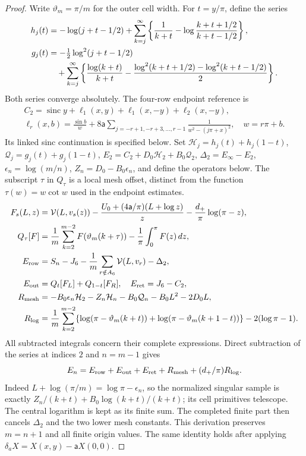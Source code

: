 \begin{proof}
Write $\vartheta_m=\pi/m$ for the outer cell width. For $t=y/\pi$, define the series
\begin{align}\label{uc:mesh-series}
 h_j(t)&=-\log(j+t-1/2)+\sum_{k=j}^\infty
 \left\{\frac1{k+t}-\log\frac{k+t+1/2}{k+t-1/2}\right\},\notag\\
 g_j(t)&=-\tfrac12\log^2(j+t-1/2)\notag\\
 &\quad+\sum_{k=j}^\infty
 \left\{\frac{\log(k+t)}{k+t}
       -\frac{\log^2(k+t+1/2)-\log^2(k+t-1/2)}2\right\}.
\end{align}
Both series converge absolutely. The four-row endpoint reference is
\[
 \begin{gathered}
 C_2=\operatorname{sinc}y+\ell_1(x,y)+\ell_1(x,-y)+\ell_2(x,-y),
 \\ \ell_r(x,b)=\frac{\sin b}{w}
   +8\mathsf{a}\sum_{j=-r+1,-r+3,\ldots,r-1}\frac1{w^2-(j\pi+x)^2},
 \quad w=r\pi+b.
 \end{gathered}
\]
Its linked sinc continuation is specified below. Set
$\mathcal H_j=h_j(t)+h_j(1-t)$, $\mathcal Q_j=g_j(t)+g_j(1-t)$,
$E_2=C_2+D_0\mathcal H_2+B_0\mathcal Q_2$,
$\Delta_2=E_\infty-E_2$, $\epsilon_n=\log(m/n)$,
$Z_n=D_0-B_0\epsilon_n$, and define the operators below.
The subscript $\tau$ in $Q_\tau$ is a local mesh offset, distinct from
the function $\tau(w)=w\cot w$ used in the endpoint estimates.
\begin{align*}
 F_s(L,z)&=\mathcal{V}(L,v_s(z))-
 \frac{U_0+(4\mathsf{a}/\pi)(L+\log z)}z-\frac{d_+}\pi\log(\pi-z),\\
 Q_\tau[F]&=\frac1m\sum_{k=2}^{m-2}F(\vartheta_m(k+\tau))
                      -\frac1\pi\int_0^\pi F(z)\,dz,\\
  E_{\rm row}&=S_n-J_6-\frac1m\sum_{r\notin A_6}\mathcal{V}(L,v_r)-\Delta_2,\\
  E_{\rm out}&=Q_t[F_L]+Q_{1-t}[F_R],\quad E_{\rm ret}=J_6-C_2,\\
 R_{\rm mesh}&=-B_0\epsilon_n\mathcal H_2-Z_n\mathcal H_n
               -B_0\mathcal Q_n-B_0L^2-2D_0L,\\
 R_{\log}&=\frac1m\sum_{k=2}^{m-2}
 \{\log(\pi-\vartheta_m(k+t))+\log(\pi-\vartheta_m(k+1-t))\}-2(\log\pi-1).
\end{align*}
All subtracted integrals concern their complete expressions. Direct
subtraction of the series at indices $2$ and $n=m-1$ gives
\begin{equation}\label{uc:telescope}
 E_n=E_{\rm row}+E_{\rm out}+E_{\rm ret}+R_{\rm mesh}
                       +(d_+/\pi)R_{\log}.
\end{equation}
Indeed $L+\log(\pi/m)=\log\pi-\epsilon_n$, so the normalized
singular sample is exactly $Z_n/(k+t)+B_0\log(k+t)/(k+t)$; its cell primitives telescope.
The central logarithm is kept as its finite sum. The completed
finite part then cancels $\Delta_2$ and the two lower mesh constants.
This derivation preserves $m=n+1$ and all finite origin values.
The same identity holds after applying
$\delta_aX=X(x,y)-\mathsf{a}X(0,0)$.


\end{proof}
